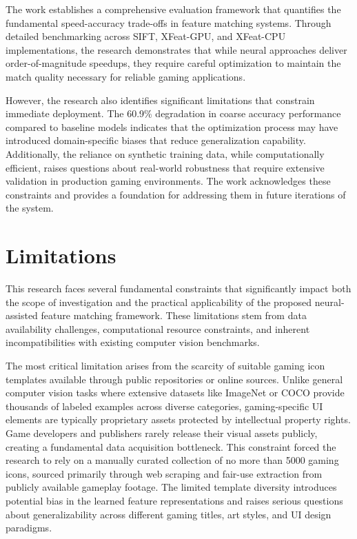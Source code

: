 The work establishes a comprehensive evaluation framework that quantifies the
fundamental speed-accuracy trade-offs in feature matching systems. Through
detailed benchmarking across SIFT, XFeat-GPU, and XFeat-CPU implementations,
the research demonstrates that while neural approaches deliver
order-of-magnitude speedups, they require careful optimization to maintain the
match quality necessary for reliable gaming applications.

However, the research also identifies significant limitations that constrain
immediate deployment. The 60.9\% degradation in coarse accuracy performance
compared to baseline models indicates that the optimization process may have
introduced domain-specific biases that reduce generalization capability.
Additionally, the reliance on synthetic training data, while computationally
efficient, raises questions about real-world robustness that require extensive
validation in production gaming environments. The work acknowledges these
constraints and provides a foundation for addressing them in future iterations
of the system.
\section{Limitations}

This research faces several fundamental constraints that significantly impact
both the scope of investigation and the practical applicability of the proposed
neural-assisted feature matching framework. These limitations stem from data
availability challenges, computational resource constraints, and inherent
incompatibilities with existing computer vision benchmarks.

The most critical limitation arises from the scarcity of suitable gaming icon
templates available through public repositories or online sources. Unlike
general computer vision tasks where extensive datasets like ImageNet or COCO
provide thousands of labeled examples across diverse categories,
gaming-specific UI elements are typically proprietary assets protected by
intellectual property rights. Game developers and publishers rarely release
their visual assets publicly, creating a fundamental data acquisition
bottleneck. This constraint forced the research to rely on a manually curated
collection of no more than 5000 gaming icons, sourced primarily through web
scraping and fair-use extraction from publicly available gameplay footage. The
limited template diversity introduces potential bias in the learned feature
representations and raises serious questions about generalizability across
different gaming titles, art styles, and UI design paradigms.

